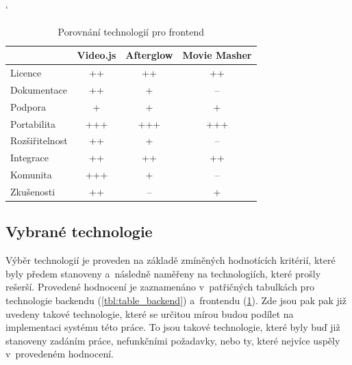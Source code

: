 \documentclass[thesis=M,czech]{FITthesis}[2012/06/26]
\begin{document}
\begin{table}
\catcode` %
\centering
\begin{tabular}{l|l|l|l|}
\cline{2-4}
\multicolumn{1}{c|}{}                 & \multicolumn{1}{c|}{Video.js} & \multicolumn{1}{c|}{Afterglow} & \multicolumn{1}{c|}{Movie Masher} \\ \hline
\multicolumn{1}{|l|}{Licence}        & \multicolumn{1}{c|}{++}      & \multicolumn{1}{c|}{++}        & \multicolumn{1}{c|}{++}         \\ \hline
\multicolumn{1}{|l|}{Dokumentace}    & \multicolumn{1}{c|}{++}      & \multicolumn{1}{c|}{+}         & \multicolumn{1}{c|}{--}                                      \\ \hline
\multicolumn{1}{|l|}{Podpora}        & \multicolumn{1}{c|}{+}       & \multicolumn{1}{c|}{+}         & \multicolumn{1}{c|}{+}                                      \\ \hline
\multicolumn{1}{|l|}{Portabilita}    & \multicolumn{1}{c|}{+++}     & \multicolumn{1}{c|}{+++}       & \multicolumn{1}{c|}{+++}                                    \\ \hline
\multicolumn{1}{|l|}{Rozšiřitelnost} & \multicolumn{1}{c|}{++}      & \multicolumn{1}{c|}{+}         & \multicolumn{1}{c|}{--}                                      \\ \hline
\multicolumn{1}{|l|}{Integrace}      & \multicolumn{1}{c|}{++}      & \multicolumn{1}{c|}{++}        & \multicolumn{1}{c|}{++}                                      \\ \hline
\multicolumn{1}{|l|}{Komunita}       & \multicolumn{1}{c|}{+++}     & \multicolumn{1}{c|}{+}         & \multicolumn{1}{c|}{--}                                      \\ \hline
\multicolumn{1}{|l|}{Zkušenosti}     & \multicolumn{1}{c|}{++}      & \multicolumn{1}{c|}{--}         & \multicolumn{1}{c|}{+}                                      \\ \hline
\end{tabular}
\caption{Porovnání technologií pro frontend}
\label{tbl:table_frontend}
\end{table}


\subsection{Vybrané technologie} \label{subsec:analyza_technologie_vybrane}

Výběr technologií je proveden na základě zmíněných hodnotících kritérií, které byly předem stanoveny a~následně naměřeny na technologiích, které prošly rešerší. Provedené hodnocení je zaznamenáno v~patřičných tabulkách pro technologie backendu (\ref{tbl:table_backend}) a~frontendu (\ref{tbl:table_frontend}). Zde jsou pak pak již uvedeny takové technologie, které se určitou mírou budou podílet na implementaci systému této práce. To jsou takové technologie, které byly buď již stanoveny zadáním práce, nefunkčními požadavky, nebo ty, které nejvíce uspěly v~provedeném hodnocení.
	
\end{document}
